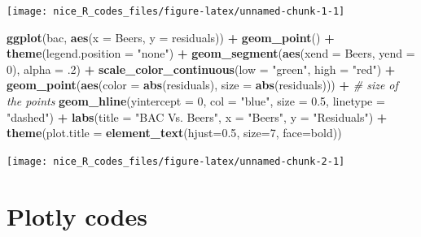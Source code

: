 \documentclass[
]{book}
\newenvironment{Shaded}{\begin{snugshade}}{\end{snugshade}}
\newcommand{\AttributeTok}[1]{\textcolor[rgb]{0.13,0.29,0.53}{#1}}
\newcommand{\CommentTok}[1]{\textcolor[rgb]{0.56,0.35,0.01}{\textit{#1}}}
\newcommand{\DecValTok}[1]{\textcolor[rgb]{0.00,0.00,0.81}{#1}}
\newcommand{\FloatTok}[1]{\textcolor[rgb]{0.00,0.00,0.81}{#1}}
\newcommand{\FunctionTok}[1]{\textcolor[rgb]{0.13,0.29,0.53}{\textbf{#1}}}
\newcommand{\NormalTok}[1]{#1}
\newcommand{\SpecialCharTok}[1]{\textcolor[rgb]{0.81,0.36,0.00}{\textbf{#1}}}
\newcommand{\StringTok}[1]{\textcolor[rgb]{0.31,0.60,0.02}{#1}}
\begin{document}
\texttt{[image: nice\_R\_codes\_files/figure-latex/unnamed-chunk-1-1]}

\begin{Shaded}
\begin{Highlighting}[]
\FunctionTok{ggplot}\NormalTok{(bac, }\FunctionTok{aes}\NormalTok{(}\AttributeTok{x =}\NormalTok{ Beers, }\AttributeTok{y =}\NormalTok{ residuals)) }\SpecialCharTok{+}
  \FunctionTok{geom\_point}\NormalTok{() }\SpecialCharTok{+}
  \FunctionTok{theme}\NormalTok{(}\AttributeTok{legend.position =} \StringTok{"none"}\NormalTok{) }\SpecialCharTok{+}
  \FunctionTok{geom\_segment}\NormalTok{(}\FunctionTok{aes}\NormalTok{(}\AttributeTok{xend =}\NormalTok{ Beers, }\AttributeTok{yend =} \DecValTok{0}\NormalTok{), }\AttributeTok{alpha =}\NormalTok{ .}\DecValTok{2}\NormalTok{) }\SpecialCharTok{+}
  \FunctionTok{scale\_color\_continuous}\NormalTok{(}\AttributeTok{low =} \StringTok{"green"}\NormalTok{, }\AttributeTok{high =} \StringTok{"red"}\NormalTok{) }\SpecialCharTok{+}   
  \FunctionTok{geom\_point}\NormalTok{(}\FunctionTok{aes}\NormalTok{(}\AttributeTok{color =} \FunctionTok{abs}\NormalTok{(residuals), }\AttributeTok{size =} \FunctionTok{abs}\NormalTok{(residuals))) }\SpecialCharTok{+}  \CommentTok{\# size of the points}
  \FunctionTok{geom\_hline}\NormalTok{(}\AttributeTok{yintercept =} \DecValTok{0}\NormalTok{, }\AttributeTok{col =} \StringTok{"blue"}\NormalTok{, }\AttributeTok{size =} \FloatTok{0.5}\NormalTok{, }\AttributeTok{linetype =} \StringTok{"dashed"}\NormalTok{) }\SpecialCharTok{+} 
  \FunctionTok{labs}\NormalTok{(}\AttributeTok{title =} \StringTok{"BAC Vs. Beers"}\NormalTok{,}
       \AttributeTok{x =} \StringTok{"Beers"}\NormalTok{,}
       \AttributeTok{y =} \StringTok{"Residuals"}\NormalTok{) }\SpecialCharTok{+}
  \FunctionTok{theme}\NormalTok{(}\AttributeTok{plot.title =} \FunctionTok{element\_text}\NormalTok{(}\AttributeTok{hjust=}\FloatTok{0.5}\NormalTok{, }\AttributeTok{size=}\DecValTok{7}\NormalTok{, }\AttributeTok{face=}\StringTok{\textquotesingle{}bold\textquotesingle{}}\NormalTok{)) }
\end{Highlighting}
\end{Shaded}

\texttt{[image: nice\_R\_codes\_files/figure-latex/unnamed-chunk-2-1]}

\hypertarget{plotly-codes}{%
\section{Plotly codes}\label{plotly-codes}}
\end{document}
